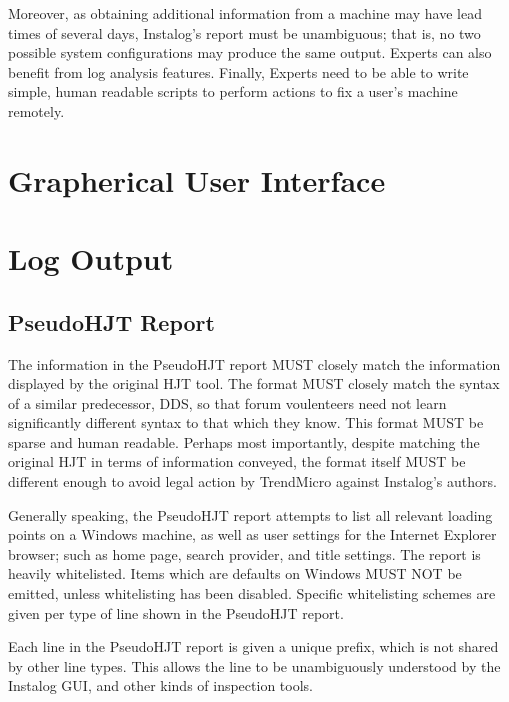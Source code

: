 \documentclass[letterpaper,12pt]{article}
\begin{document}
Moreover, as obtaining additional information from a machine may
have lead times of several days, Instalog's report must be unambiguous; that is,
no two possible system configurations may produce the same output. Experts can
also benefit from log analysis features. Finally, Experts need to be able to
write simple, human readable scripts to perform actions to fix a user's machine
remotely.

\section{Grapherical User Interface}
\section{Log Output}
\subsection{PseudoHJT Report}
The information in the PseudoHJT report MUST closely match the information
displayed by the original HJT tool. The format MUST closely match the syntax of
a similar predecessor, DDS, so that forum voulenteers need not learn
significantly different syntax to that which they know. This format MUST be
sparse and human readable. Perhaps most importantly, despite matching the
original HJT in terms of information conveyed, the format itself MUST be
different enough to avoid legal action by TrendMicro against Instalog's authors.

Generally speaking, the PseudoHJT report attempts to list all relevant loading
points on a Windows machine, as well as user settings for the Internet Explorer
browser; such as home page, search provider, and title settings. The report is
heavily whitelisted. Items which are defaults on Windows MUST NOT be emitted,
unless whitelisting has been disabled. Specific whitelisting schemes are given
per type of line shown in the PseudoHJT report.

Each line in the PseudoHJT report is given a unique prefix, which is not shared
by other line types. This allows the line to be unambiguously understood by the
Instalog GUI, and other kinds of inspection tools.
\end{document}

